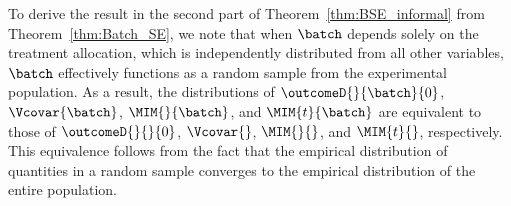 \begin{remark}
    To derive the result in the second part of Theorem~\ref{thm:BSE_informal} from Theorem~\ref{thm:Batch_SE}, we note that when $\batch$ depends solely on the treatment allocation, which is independently distributed from all other variables, $\batch$ effectively functions as a random sample from the experimental population. As a result, the distributions of $\outcomeD{}{\batch}{0}$, $\Vcovar{\batch}$, $\MIM{}{\batch}$, and $\MIM{t}{\batch}$ are equivalent to those of $\outcomeD{}{}{0}$, $\Vcovar{}$, $\MIM{}{}$, and $\MIM{t}{}$, respectively. This equivalence follows from the fact that the empirical distribution of quantities in a random sample converges to the empirical distribution of the entire population.
\end{remark}



